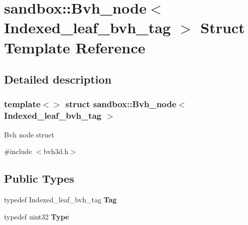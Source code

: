 \hypertarget{structsandbox_1_1_bvh__node_3_01_indexed__leaf__bvh__tag_01_4}{}\section{sandbox\+:\+:Bvh\+\_\+node$<$ Indexed\+\_\+leaf\+\_\+bvh\+\_\+tag $>$ Struct Template Reference}
\label{structsandbox_1_1_bvh__node_3_01_indexed__leaf__bvh__tag_01_4}


\subsection{Detailed description}
\subsubsection*{template$<$$>$\newline
struct sandbox\+::\+Bvh\+\_\+node$<$ Indexed\+\_\+leaf\+\_\+bvh\+\_\+tag $>$}

Bvh node struct 

{\ttfamily \#include $<$bvh3d.\+h$>$}

\subsection*{Public Types}
\begin{DoxyCompactItemize}
\item 
\mbox{\label{structsandbox_1_1_bvh__node_3_01_indexed__leaf__bvh__tag_01_4_a4760b7377876a0c35050900598eb6fcc}} 
typedef Indexed\+\_\+leaf\+\_\+bvh\+\_\+tag {\bfseries Tag}
\item 
\mbox{\label{structsandbox_1_1_bvh__node_3_01_indexed__leaf__bvh__tag_01_4_af42c0e3b113e4fc548a1e94cce499208}} 
typedef uint32 {\bfseries Type}
\end{DoxyCompactItemize}
